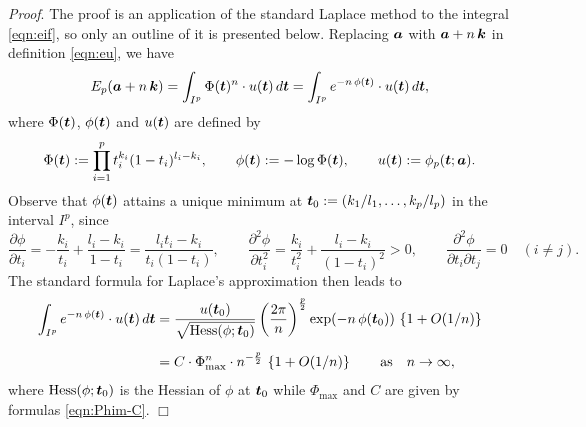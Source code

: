 \documentclass[a4paper,12pt]{article}
\theoremstyle{plain}
\def\ba{\mbox{\boldmath $a$}}
\def\bk{\mbox{\boldmath $k$}}
\def\bt{\mbox{\boldmath $t$}}
\def\sbt{\mbox{\boldmath ${\ss t}$}}
\def\Phim{\Phi_{\scriptstyle \mathrm{max}}}
\def\ss{\scriptstyle}
\begin{document}
{\it Proof}. 
The proof is an application of the standard Laplace method to the 
integral \eqref{eqn:eif}, so only an outline of it is presented below.  
Replacing $\ba$ with $\ba + n \, \bk$ in 
definition \eqref{eqn:eu}, we have  
\begin{equation*}
E_p(\ba + n \, \bk) 
= \int_{I^p} \Phi(\bt)^n \cdot u(\bt) \, d \bt  
= \int_{I^p} e^{- n \, \phi(\sbt)} \cdot u(\bt) \, d \bt,  
\end{equation*}
where $\Phi(\bt)$, $\phi(\bt)$ and $u(\bt)$ are defined by 
\[
\Phi(\bt) := \prod_{i=1}^p t_i^{k_{i}}(1-t_i)^{l_i-k_i}, \qquad 
\phi(\bt) := - \log \Phi(\bt), \qquad u(\bt) := \phi_p(\bt; \ba). 
\]
Observe that $\phi(\bt)$ attains a unique minimum at 
$\bt_0 := (k_1/l_1, \dots, k_p/l_p)$ in the interval $I^p$, 
since  
\[
\frac{\partial \phi}{\partial t_i} = 
- \frac{k_i}{t_i} + \frac{l_i-k_i}{1-t_i} = \frac{l_i t_i - k_i}{t_i(1-t_i)}, 
\qquad 
\frac{\partial^2 \phi}{\partial t_i^2} 
= \frac{k_i}{t_i^2} + \frac{l_i - k_i}{(1-t_i)^2} > 0, 
\qquad 
\frac{\partial^2 \phi}{\partial t_i \partial t_j} = 0 \quad (i \neq j).  
\]
The standard formula for Laplace's approximation then leads to 
\[
\begin{split}
\int_{I^p} e^{- n \, \phi(\sbt)} \cdot u(\bt) \, d \bt 
&= \dfrac{u(\bt_0)}{\sqrt{\mathrm{Hess}(\phi; \bt_0)}} 
\left(\frac{2 \pi}{n} \right)^{ \frac{p}{2} } \exp(-n \, \phi(\bt_0)) \,  
\left\{ 1 + O (1/n) \right\} \\[2mm] 
&= C \cdot \Phim^n \cdot n^{- \frac{p}{2} } \, \left\{1+ O(1/n) \right\}   
\qquad \mbox{as} \quad n \to \infty, 
\end{split} 
\]
where $\mathrm{Hess}(\phi; \bt_0)$ is the Hessian of $\phi$ at $\bt_0$ 
while $\Phim$ and $C$ are given by formulas 
\eqref{eqn:Phim-C}.  \hfill $\Box$ 
\end{document}
